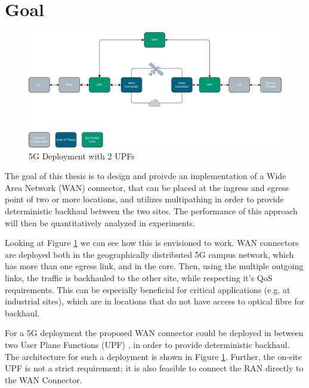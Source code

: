 
\section{Goal}
\label{sec:goal}

\begin{figure}[h]
    \centering
        \includegraphics[width=\textwidth]{fig/telco-use-case-2.png}
        \caption{5G Deployment with 2 UPFs}
        \label{fig:telco}
\end{figure}

The goal of this thesis is to design and proivde an implementation of a Wide Area Network (WAN) connector, that can be placed at the ingress and egress point of two or more locations, and utilizes multipathing in order to provide deterministic backhaul between the two sites. The performance of this approach will then be quantitatively analyzed in experiments.

Looking at Figure \ref{fig:telco} we can see how this is envisioned to work. WAN connectors are deployed both in the geographically distributed 5G campus network, which has more than one egress link, and in the core. Then, using the multiple outgoing links, the traffic is backhauled to the other site, while respecting it's QoS requirements. This can be especially beneficial for critical applications (e.g. at industrial sites), which are in locations that do not have access to optical fibre for backhaul.

For a 5G deployment the proposed WAN connector could be deployed in between two User Plane Functions (UPF) , in order to provide deterministic backhaul. The architecture for such a deployment is shown in Figure \ref{fig:telco}. Further, the on-site UPF is not a strict requirement; it is also feasible to connect the RAN directly to the WAN Connector.

